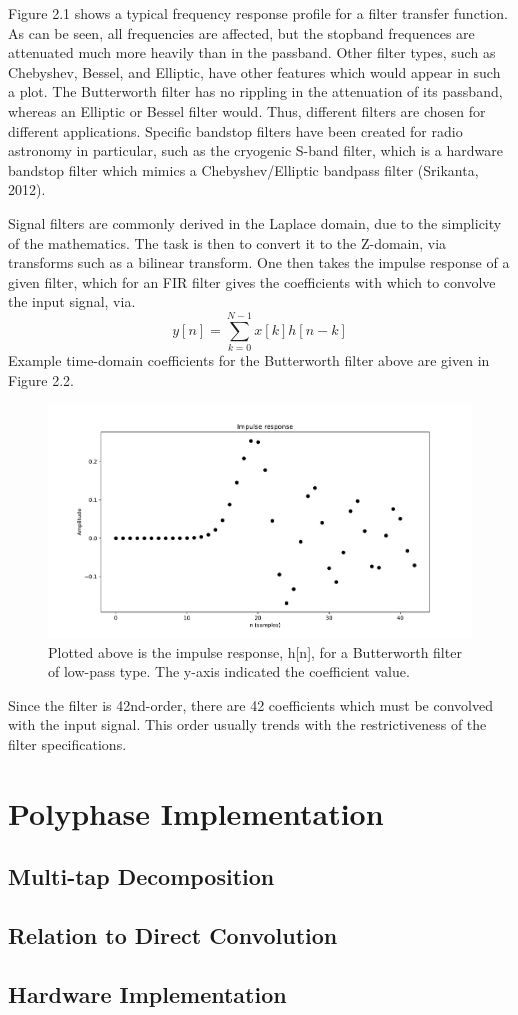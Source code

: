 \documentclass{report}
\begin{document}
Figure 2.1 shows a typical frequency response profile for a filter transfer function.  As can be seen, all frequencies are affected, but the stopband frequences are attenuated much more heavily than in the passband.  Other filter types, such as Chebyshev, Bessel, and Elliptic, have other features which would appear in such a plot.  The Butterworth filter has no rippling in the attenuation of its passband, whereas an Elliptic or Bessel filter would.  Thus, different filters are chosen for different applications.  Specific bandstop filters have been created for radio astronomy in particular, such as the cryogenic S-band filter, which is a hardware bandstop filter which mimics a Chebyshev/Elliptic bandpass filter (Srikanta, 2012).

Signal filters are commonly derived in the Laplace domain, due to the simplicity of the mathematics.  The task is then to convert it to the Z-domain, via transforms such as a bilinear transform.  One then takes the impulse response of a given filter, which for an FIR filter gives the coefficients with which to convolve the input signal, via.
\begin{equation}
y[n] = \sum^{N-1}_{k=0}x[k]h[n-k]
\end{equation}
Example time-domain coefficients for the Butterworth filter above are given in Figure 2.2.  

\begin{figure}[ht]
\includegraphics[scale=.4]{Figure_3.pdf}
\caption{Plotted above is the impulse response, h[n], for a Butterworth filter of low-pass type.  The y-axis indicated the coefficient value.}
\end{figure} 

Since the filter is 42nd-order, there are 42 coefficients which must be convolved with the input signal.  This order usually trends with the restrictiveness of the filter specifications.

 
\chapter{Polyphase Implementation}
\section{Multi-tap Decomposition}
\section{Relation to Direct Convolution}
\section{Hardware Implementation}
 
\end{document}
